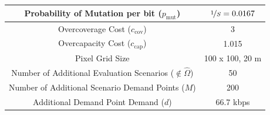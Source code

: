 \documentclass[12pt,dvipsnames]{report}
\begin{document}
\begin{table}[p]
\begin{tabular}{|c|c|}
		\hline
		Probability of Mutation per bit ($p_\text{mut}$) & $\nicefrac{1}{S} = 0.0167$ \\
		\hline 
		Overcoverage Cost ($c_\text{cov}$) & 3 \\
		\hline
		Overcapacity Cost ($c_\text{cap}$) & 1.015 \\ 
		\hline
		Pixel Grid Size & 100 x 100, 20 m \\
		\hline
		\hline
		Number of Additional Evaluation Scenarios ($\not\in \hat{\Omega}$) & 50 \\
		\hline
		Number of Additional Scenario Demand Points ($M$) & 200 \\
		\hline
		Additional Demand Point Demand ($d$) & 66.7 kbps \\
		\hline
	\end{tabular}
	\label{tab:Prelim_SimVal}
\end{table}
\end{document}
